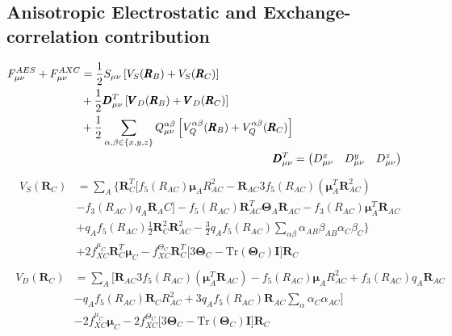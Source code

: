 \subsection{Anisotropic Electrostatic and Exchange-correlation contribution}
\begin{align}
    \begin{split}
    F^{AES}_{\mu\nu}+F^{AXC}_{\mu\nu} &= \frac{1}{2}S_{\mu\nu}\left[V_S(\pmb{R}_B)+ V_S(\pmb{R}_C)\right]\\
    &+ \frac{1}{2}\pmb{D}^T_{\mu\nu}\left[\pmb{V}_D(\pmb{R}_B)+\pmb{V}_D(\pmb{R}_C)\right]\\
    &+ \frac{1}{2} \sum_{\alpha,\beta\in\{x,y,z\}} Q^{\alpha\beta}_{\mu\nu}\left[V_Q^{\alpha\beta}(\pmb{R}_B)+ V_Q^{\alpha\beta}(\pmb{R}_C)\right]
    \end{split}\\
    \pmb{D}^T_{\mu\nu} &=
    \begin{pmatrix}
        D^x_{\mu\nu} &
        D^y_{\mu\nu} &
        D^z_{\mu\nu}\\
    \end{pmatrix}\\
\end{align}
\begin{align}
    \begin{split}
        V_S(\pmb{R}_C)& = \sum_A \Biggl\{
        \pmb{R}_C^T\biggl[
            f_5(R_{AC})\pmb{\mu}_AR^2_{AC} - 
            \pmb{R}_{AC}3f_5(R_{AC})(\pmb{\mu}_A^T\pmb{R}^2_{AC}) \\&- 
            f_3(R_{AC})q_A\pmb{R}_AC
        \biggr] 
    - f_5(R_{AC})\pmb{R}^T_{AC}\pmb{\Theta}_A\pmb{R}_{AC}
          - f_3(R_{AC})\pmb{\mu}^T_{A}\pmb{R}_{AC}\\
          &+q_Af_5(R_{AC})\frac{1}{2}\pmb{R}_C^2\pmb{R}_{AC}^2 
          - \frac{3}{2}q_Af_5(R_{AC})\sum_{\alpha\beta}\alpha_{AB}\beta_{AB}\alpha_{C}\beta_{C}\Biggr\}\\
      &+2f_{XC}^{\mu_C}\pmb R^T_C\pmb\mu_C - f_{XC}^{\Theta_C}\pmb R^T_C\biggl[3\pmb\Theta_C-\text{Tr}(\pmb\Theta_C)\pmb I\biggr]\pmb R_C
    \end{split}
\end{align}
\begin{align}
    \begin{split}
        V_D(\pmb{R}_C)
            &= \sum_A \Biggl[
                \pmb{R}_{AC}3f_5(R_{AC})(\pmb{\mu}_A^T\pmb{R}_{AC}) -
                f_5(R_{AC})\pmb{\mu}_AR^2_{AC} + 
                f_3(R_{AC})q_A\pmb{R}_{AC}\\
            &-q_Af_5(R_{AC})\pmb{R}_CR_{AC}^2 + 
                3q_Af_5(R_{AC})\pmb{R}_{AC}\sum_\alpha\alpha_C\alpha_{AC}\Biggr]\\
      &-2f_{XC}^{\mu_C}\pmb\mu_C - 2f_{XC}^{\Theta_C}\biggl[3\pmb\Theta_C-\text{Tr}(\pmb\Theta_C)\pmb I\biggr]\pmb R_C
    \end{split}
\end{align}
